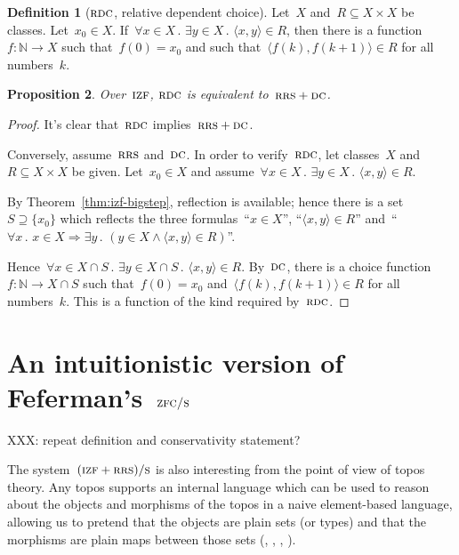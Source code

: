 \documentclass[oneside,reqno]{amsart}
\theoremstyle{definition}
\newtheorem{defn}{Definition}[section]
\theoremstyle{plain}
\newtheorem{prop}[defn]{Proposition}
\theoremstyle{remark}
\newcommand{\NN}{\mathbb{N}}
\renewcommand{\_}{\mathpunct{.}\,}
\newcommand{\?}{\,{:}\,}
\newcommand{\IZF}{\textsc{izf}}
\newcommand{\ZFCS}{\textsc{zfc/s}}
\newcommand{\RRS}{\textsc{rrs}}
\newcommand{\RDC}{\textsc{rdc}}
\newcommand{\DC}{\textsc{dc}}
\newcommand{\ES}{(\IZF+\RRS)/\textsc{s}}
\begin{document}
\begin{defn}[$\RDC$, relative dependent choice]
Let~$X$ and~$R \subseteq X \times X$ be classes. Let~$x_0 \in X$.
If~$\forall x \in X\_ \exists y \in X\_ \langle x,y \rangle \in R$,
then there is a function~$f : \NN \to X$ such that~$f(0) = x_0$ and
such that~$\langle f(k), f(k+1) \rangle \in R$ for all numbers~$k$.
\end{defn}

\begin{prop}Over~$\IZF$, $\RDC$ is equivalent to~$\RRS + \DC$.
\end{prop}

\begin{proof}It's clear that~$\RDC$ implies~$\RRS + \DC$. %

Conversely, assume~$\RRS$ and~$\DC$. In order to verify~$\RDC$, let classes~$X$
and~$R \subseteq X \times X$ be given. Let~$x_0 \in X$ and assume~$\forall x
\in X\_ \exists y \in X\_ \langle x,y \rangle \in R$.

By Theorem~\ref{thm:izf-bigstep}, reflection is available; hence there is a
set~$S \supseteq \{x_0\}$ which reflects the three formulas~``$x \in X$'', ``$\langle x,y
\rangle \in R$'' and~``$\forall x\_ x \in X \Rightarrow \exists y\_ (y \in X \wedge \langle x,y
\rangle \in R)$''.

Hence~$\forall x \in X \cap S\_ \exists y \in X \cap S\_ \langle x,y \rangle
\in R$. By~$\DC$, there is a choice function~$f : \NN \to X \cap S$ such
that~$f(0) = x_0$ and~$\langle f(k), f(k+1) \rangle \in R$ for all numbers~$k$.
This is a function of the kind required by~$\RDC$.
\end{proof}


\section{An intuitionistic version of Feferman's~$\ZFCS$}

XXX: repeat definition and conservativity statement?

The system~$\ES$ is also interesting from the point of view of topos theory.
Any topos supports an internal language which can be used to reason about the
objects and morphisms of the topos in a naive element-based language, allowing
us to pretend that the objects are plain sets (or types) and that the morphisms
are plain maps between those sets (\cite[Chapter~6]{borceux:handbook3},
\cite[Section~1.3]{caramello:ttt}, \cite[Chapter~14]{goldblatt:topoi},
\cite[Chapter~VI]{moerdijk-maclane:sheaves-logic}).
\end{document}
